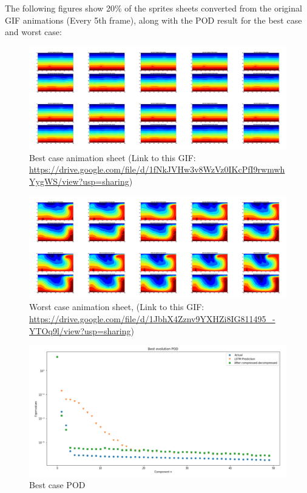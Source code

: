 The following figures show 20\% of the sprites sheets converted from the original GIF animations (Every 5th frame), along with the POD result for the best case and worst case:

\begin{figure}[H]
    \centering
    \caption{Best case animation sheet (Link to this GIF: \url{https://drive.google.com/file/d/1fNkJVHw3v8WzVz0IKcPfI9rwmwhYygWS/view?usp=sharing})}
    \includegraphics[scale=0.10]{figures/mantle_convection_images/larger_dataset_interpolated/LSTM_Best_GIF_sheet.png}
\end{figure}

\begin{figure}[H]
    \centering
    \caption{Worst case animation sheet, (Link to this GIF: 
    \url{https://drive.google.com/file/d/1JbhX4Zznv9YXHZi8IG811495_-YTOq9l/view?usp=sharing})}
    \includegraphics[scale=0.10]{figures/mantle_convection_images/larger_dataset_interpolated/LSTM_Worst_GIF_sheet.png}
\end{figure}


\begin{figure}[H]
    \caption{Best case POD}
    \includegraphics[scale=0.5]{figures/mantle_convection_images/larger_dataset_interpolated/LSTM_Best_POD.png}
\end{figure}

